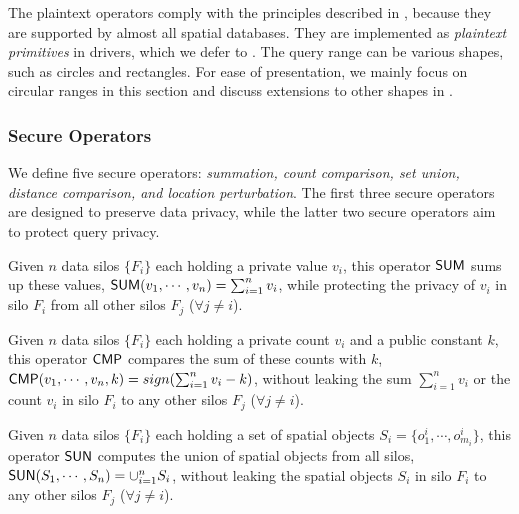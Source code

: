 The plaintext operators comply with the principles described in , because they are supported by almost all spatial databases.
They are implemented as \textit{plaintext primitives} in \sysname drivers, which we defer to .
The query range can be various shapes, such as circles and rectangles. 
For ease of presentation, we mainly focus on circular ranges in this section and discuss extensions to other shapes in .

\subsubsection{Secure Operators}
\label{sec:cross-silo}

We define five secure operators: \textit{summation, count comparison, set union, distance comparison, and location perturbation}. The first three secure operators are designed to preserve data privacy, while the latter two secure operators aim to protect query privacy.

\begin{definition}
\label{def:ssum}
Given $n$ data silos $\{F_i\}$ each holding a private value $v_i$, this operator $\textsf{SUM}$ sums up these values, \ie $\textsf{SUM}(v_1,\cdots,v_n) = \sum_{i=1}^n{v_i}$,
while protecting the privacy of $v_i$ in silo $F_i$ from all other silos $F_j$ ($\forall j \neq i$).
\end{definition}

\begin{definition}
\label{def:scmp}
Given $n$ data silos $\{F_i\}$ each holding a private count $v_i$ and a public constant $k$, this operator $\textsf{CMP}$ compares the sum of these counts with $k$, \ie $\textsf{CMP}(v_1,\cdots,v_n,k) = sign(\sum_{i=1}^n{v_i}-k)$, without leaking the sum $\sum_{i=1}^n{v_i}$ or the count $v_i$ in silo $F_i$ to any other silos $F_j$ ($\forall j \neq i$).
\end{definition}

\begin{definition}
\label{def:ssun}
Given $n$ data silos $\{F_i\}$ each holding a set of spatial objects $S_i=\{o^i_{1}, \cdots, o^i_{{m_i}}\}$, this operator $\textsf{SUN}$ computes the union of spatial objects from all silos,
\ie $\textsf{SUN}(S_1,\cdots,S_n) = \cup_{i=1}^{n}S_i$,
without leaking the spatial objects $S_i$ in silo $F_i$ to any other silos $F_j$ ($\forall j \neq i$).
\end{definition}

